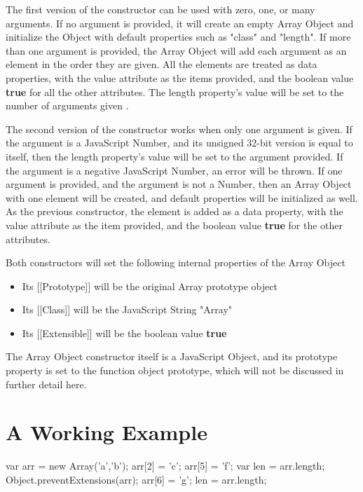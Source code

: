 \documentclass[a4paper,11pt,twoside]{report}
\begin{document}
The first version of the constructor can be used with zero, one, or many arguments. If no argument is provided, it will create an empty Array Object and initialize the Object with default properties such as "class" and "length". If more than one argument is provided, the Array Object will add each argument as an element in the order they are given. All the elements are treated as data properties, with the value attribute as the items provided, and the boolean value \textbf{true} for all the other attributes. The length property's value will be set to the number of arguments given \cite{EcmaScript}.

The second version of the constructor works when only one argument is given. If the argument is a JavaScript Number, and its unsigned 32-bit version is equal to itself, then the length property's value will be set to the argument provided. If the argument is a negative JavaScript Number, an error will be thrown. If one argument is provided, and the argument is not a Number, then an Array Object with one element will be created, and default properties will be initialized as well. As the previous constructor, the element is added as a data property, with the value attribute as the item provided, and the boolean value \textbf{true} for the other attributes. 

Both constructors will set the following internal properties of the Array Object
\begin{itemize}
\item Its [[Prototype]] will be the original Array prototype object
\item Its [[Class]] will be the JavaScript String "Array"
\item Its [[Extensible]] will be the boolean value \textbf{true}
\end{itemize}

The Array Object constructor itself is a JavaScript Object, and its prototype property is set to the function object prototype, which will not be discussed in further detail here.

\section*{A Working Example}
\begin{adjustwidth}{4cm}{4cm}
\begin{lstjs}
var arr = new Array('a','b');
arr[2] = 'c';
arr[5] = 'f';
var len = arr.length;
Object.preventExtensions(arr);
arr[6] = 'g';
len = arr.length;
\end{lstjs}
\end{adjustwidth}
\end{document}
